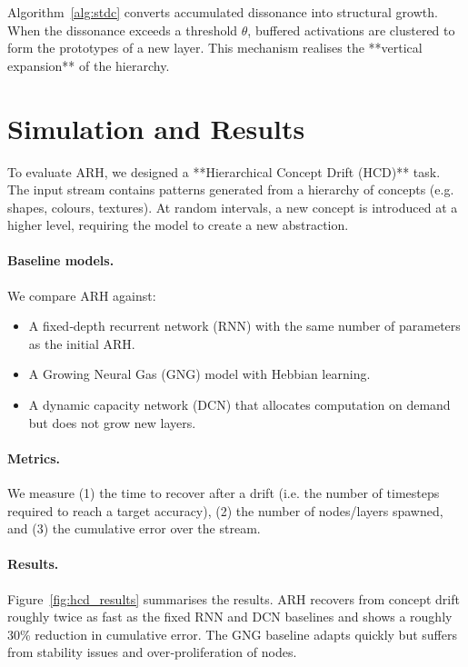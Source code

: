 \documentclass{article}
\begin{document}
Algorithm \ref{alg:stdc} converts accumulated dissonance into structural growth.  When the dissonance exceeds a threshold $\theta$, buffered activations are clustered to form the prototypes of a new layer.  This mechanism realises the **vertical expansion** of the hierarchy.

\section{Simulation and Results}

To evaluate ARH, we designed a **Hierarchical Concept Drift (HCD)** task.  The input stream contains patterns generated from a hierarchy of concepts (e.g. shapes, colours, textures).  At random intervals, a new concept is introduced at a higher level, requiring the model to create a new abstraction.

\paragraph{Baseline models.}  We compare ARH against:
\begin{itemize}
    \item A fixed‑depth recurrent network (RNN) with the same number of parameters as the initial ARH.
    \item A Growing Neural Gas (GNG) model with Hebbian learning.
    \item A dynamic capacity network (DCN) that allocates computation on demand but does not grow new layers.
\end{itemize}

\paragraph{Metrics.}  We measure (1) the time to recover after a drift (i.e. the number of timesteps required to reach a target accuracy), (2) the number of nodes/layers spawned, and (3) the cumulative error over the stream.

\paragraph{Results.}  Figure \ref{fig:hcd_results} summarises the results.  ARH recovers from concept drift roughly twice as fast as the fixed RNN and DCN baselines and shows a roughly 30\% reduction in cumulative error.  The GNG baseline adapts quickly but suffers from stability issues and over‑proliferation of nodes.
\end{document}

